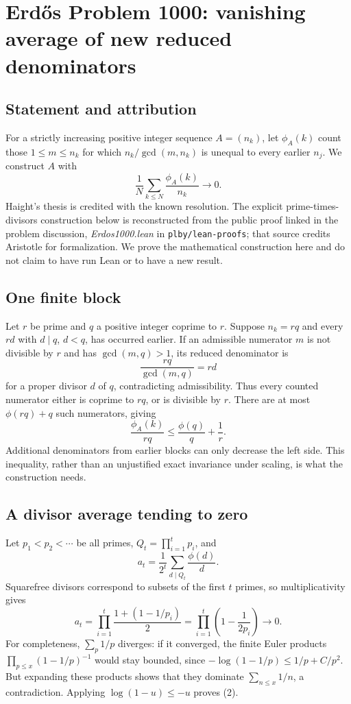 \section*{Erd\H{o}s Problem 1000: vanishing average of new reduced denominators}
\subsection*{Statement and attribution}
For a strictly increasing positive integer sequence $A=(n_k)$, let $\phi_A(k)$ count those $1\le m\le n_k$ for which
$n_k/\gcd(m,n_k)$ is unequal to every earlier $n_j$.
We construct $A$ with
\[
 \frac1N\sum_{k\le N}\frac{\phi_A(k)}{n_k}\longrightarrow0.
\]
Haight's thesis is credited with the known resolution. The explicit prime-times-divisors construction below is reconstructed from the public proof linked in the problem discussion, \emph{Erdos1000.lean} in \texttt{plby/lean-proofs}; that source credits Aristotle for formalization. We prove the mathematical construction here and do not claim to have run Lean or to have a new result.

\subsection*{One finite block}
Let $r$ be prime and $q$ a positive integer coprime to $r$. Suppose $n_k=rq$ and every $rd$ with $d\mid q$, $d<q$, has occurred earlier.
If an admissible numerator $m$ is not divisible by $r$ and has $\gcd(m,q)>1$, its reduced denominator is
\[
 \frac{rq}{\gcd(m,q)}=rd
\]
for a proper divisor $d$ of $q$, contradicting admissibility.
Thus every counted numerator either is coprime to $rq$, or is divisible by $r$. There are at most $\phi(rq)+q$ such numerators, giving
\[
 \frac{\phi_A(k)}{rq}\le
 \frac{\phi(q)}q+\frac1r.
 \tag{1}
\]
Additional denominators from earlier blocks can only decrease the left side. This inequality, rather than an unjustified exact invariance under scaling, is what the construction needs.

\subsection*{A divisor average tending to zero}
Let $p_1<p_2<\cdots$ be all primes, $Q_t=\prod_{i=1}^{t}p_i$, and
\[
 a_t=\frac1{2^t}\sum_{d\mid Q_t}\frac{\phi(d)}d.
\]
Squarefree divisors correspond to subsets of the first $t$ primes, so multiplicativity gives
\[
 a_t=\prod_{i=1}^{t}\frac{1+(1-1/p_i)}2
 =\prod_{i=1}^{t}\left(1-\frac1{2p_i}\right)\longrightarrow0.
 \tag{2}
\]
For completeness, $\sum_p1/p$ diverges: if it converged, the finite Euler products $\prod_{p\le x}(1-1/p)^{-1}$ would stay bounded, since
$-\log(1-1/p)\le1/p+C/p^2$. But expanding these products shows that they dominate $\sum_{n\le x}1/n$, a contradiction. Applying $\log(1-u)\le-u$ proves (2).

